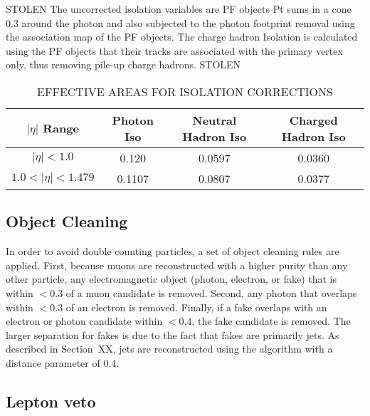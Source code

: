 STOLEN %
The uncorrected isolation variables are PF objects 
Pt sums in a cone 0.3 around the photon and also subjected to 
the photon footprint removal using the association map of the PF objects. 
The charge hadron Isolation is calculated using the PF objects that their tracks are associated with the primary vertex only, thus removing pile-up charge hadrons.
STOLEN 

\begin{table}[ht]
    \caption{EFFECTIVE AREAS FOR ISOLATION CORRECTIONS}
    \centering
    \begin{tabular}{ | c | c c c |}
        \hline
        	\hline
        \textbf{$|\eta|$ Range} & \textbf{Photon Iso} & \textbf{Neutral Hadron Iso} & \textbf{Charged Hadron Iso} \\ [0.5ex]
        \hline
        	$|\eta| < 1.0 $                 & 0.120   &  0.0597 & 0.0360\\
	$ 1.0 < |\eta| < 1.479 $   & 0.1107 & 0.0807 & 0.0377 \\
		 \hline
           \hline
    \end{tabular}
    \label{tab:ID}
\end{table}



\subsection{Object Cleaning}
\label{sec:ObjCleaning}

In order to avoid double counting particles, a set of object cleaning rules are applied. 
First, because muons are reconstructed with a higher purity than any other particle, 
any electromagnetic object (photon, electron, or fake) that is within \dR $< 0.3$ of a muon candidate is removed.
Second, any photon that overlaps within \dR $< 0.3$ of an electron is removed. Finally, if a fake overlaps with an electron or 
photon candidate within \dR $< 0.4$, the fake candidate is removed. The larger \dR separation for fakes is due to the fact
that fakes are primarily jets. As described in Section~XX, jets are reconstructed using the \antikt algorithm with a distance
parameter of 0.4.  

\subsection{Lepton veto}
\label{sec:lepVeto}

